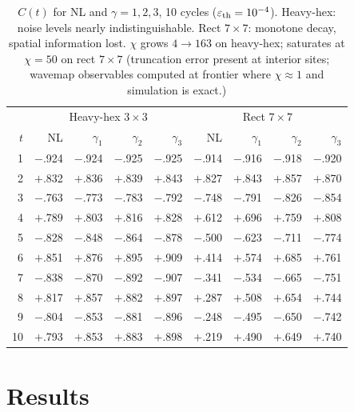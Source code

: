 \documentclass[letterpaper]{article}
\begin{document}
\begin{table}[!t]
\centering
\setlength{\tabcolsep}{3pt}
\small
\begin{tabular}{r|rrrr|rrrr}
\toprule
 & \multicolumn{4}{c|}{Heavy-hex $3\times3$} & \multicolumn{4}{c}{Rect $7\times7$} \\
$t$ & NL & $\gamma_1$ & $\gamma_2$ & $\gamma_3$ & NL & $\gamma_1$ & $\gamma_2$ & $\gamma_3$ \\
\midrule
 1 & $-$.924 & $-$.924 & $-$.925 & $-$.925 & $-$.914 & $-$.916 & $-$.918 & $-$.920 \\
 2 & $+$.832 & $+$.836 & $+$.839 & $+$.843 & $+$.827 & $+$.843 & $+$.857 & $+$.870 \\
 3 & $-$.763 & $-$.773 & $-$.783 & $-$.792 & $-$.748 & $-$.791 & $-$.826 & $-$.854 \\
 4 & $+$.789 & $+$.803 & $+$.816 & $+$.828 & $+$.612 & $+$.696 & $+$.759 & $+$.808 \\
 5 & $-$.828 & $-$.848 & $-$.864 & $-$.878 & $-$.500 & $-$.623 & $-$.711 & $-$.774 \\
 6 & $+$.851 & $+$.876 & $+$.895 & $+$.909 & $+$.414 & $+$.574 & $+$.685 & $+$.761 \\
 7 & $-$.838 & $-$.870 & $-$.892 & $-$.907 & $-$.341 & $-$.534 & $-$.665 & $-$.751 \\
 8 & $+$.817 & $+$.857 & $+$.882 & $+$.897 & $+$.287 & $+$.508 & $+$.654 & $+$.744 \\
 9 & $-$.804 & $-$.853 & $-$.881 & $-$.896 & $-$.248 & $-$.495 & $-$.650 & $-$.742 \\
10 & $+$.793 & $+$.853 & $+$.883 & $+$.898 & $+$.219 & $+$.490 & $+$.649 & $+$.740 \\
\bottomrule
\end{tabular}
\caption{$C(t)$ for NL and $\gamma=1,2,3$, 10 cycles ($\varepsilon_{\rm th}=10^{-4}$).
Heavy-hex: noise levels nearly indistinguishable.
Rect $7\times7$: monotone decay, spatial information lost.
$\chi$ grows $4\to163$ on heavy-hex; saturates at $\chi=50$ on rect $7\times7$
(truncation error present at interior sites; wavemap observables computed at
frontier where $\chi\approx1$ and simulation is exact.)}
\label{tab:ct}
\end{table}

\section{Results}
\label{sec:results}
\end{document}
